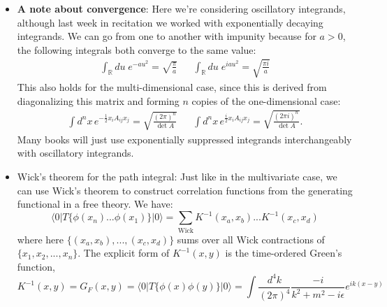 \documentclass[12pt, oneside]{article}   	%
\theoremstyle{definition}
\begin{document}
\begin{itemize}
	\item \textbf{A note about convergence}: Here we're considering oscillatory integrands, although last week in recitation we worked with exponentially decaying integrands. We can go from one to another with impunity because for $a > 0$, the following integrals both converge to the same value:
	\begin{align}
		\int_{\mathbb R} du\; e^{-au^2} = \sqrt{\frac{\pi}{a}} && \int_{\mathbb R} du\; e^{iau^2} = \sqrt{\frac{\pi i}{a}}
	\end{align}
	This also holds for the multi-dimensional case, since this is derived from diagonalizing this matrix and forming $n$ copies of the one-dimensional case:
	\begin{align}
		\int d^n x\, e^{-\frac{1}{2} x_i A_{ij} x_j} = \sqrt{\frac{(2\pi)^n}{\det A}} && \int d^n x\, e^{\frac{i}{2} x_i A_{ij} x_j} = \sqrt{\frac{(2\pi i)^n}{\det A}}.
	\end{align}
	Many books will just use exponentially suppressed integrands interchangeably with oscillatory integrands. 

	\item Wick's theorem for the path integral: Just like in the multivariate case, we can use Wick's theorem to construct correlation functions from the generating functional in a free theory. We have:
	\begin{equation}
		\langle 0 | T\{\phi(x_n) ... \phi(x_1) \} |0\rangle = \sum_{\mathrm{Wick}} K^{-1}(x_a, x_b) ... K^{-1}(x_c, x_d)
	\end{equation}
	where here $\{(x_a, x_b), ..., (x_c, x_d)\}$ sums over all Wick contractions of $\{x_1, x_2, ..., x_n\}$. The explicit form of $K^{-1}(x, y)$ is the time-ordered Green's function,
	\begin{equation}
		K^{-1}(x, y) = G_F(x, y) = \langle 0 | T\{\phi(x) \phi(y) \} | 0\rangle = \int\frac{d^4 k}{(2\pi)^4} \frac{-i}{k^2 + m^2 - i\epsilon} e^{i k (x - y)}
	\end{equation}
	
	

\end{itemize}
\end{document}
